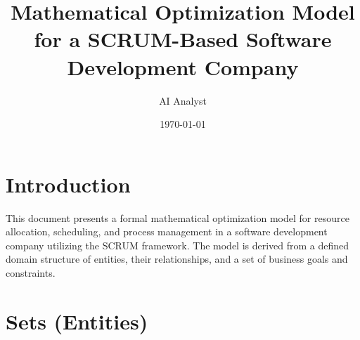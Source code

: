 \documentclass[11pt]{article}
\title{Mathematical Optimization Model for a SCRUM-Based Software Development Company}
\author{AI Analyst}
\date{\today}
\begin{document}
\maketitle
\tableofcontents
\newpage

\section*{Introduction}
This document presents a formal mathematical optimization model for resource allocation, scheduling, and process management in a software development company utilizing the SCRUM framework. The model is derived from a defined domain structure of entities, their relationships, and a set of business goals and constraints.

\section{Sets (Entities)}
\end{document}
